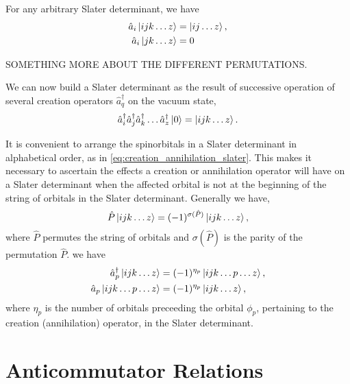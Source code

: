     For any arbitrary Slater determinant, we have 
    \begin{align}
        \hat{a}_i \ket{ijk \dots z} &= \ket{ij \dots z}, \\
        \hat{a}_i \ket{jk \dots z} &= 0       
    \end{align}

    SOMETHING MORE ABOUT THE DIFFERENT PERMUTATIONS.

    We can now build a Slater determinant as the result of successive operation of
    several creation operators $\hat{a}_q^\dagger$ on the vacuum state,
    \begin{equation}
        \label{eq:creation_annihilation_slater}
        \hat{a}^\dagger_i \hat{a}^\dagger_j \hat{a}^\dagger_k \dots \hat{a}^\dagger_z
        \ket{0} = \ket{ijk \dots z}.
    \end{equation}

    It is convenient to arrange the spinorbitals in a Slater determinant in
    alphabetical order, as in \autoref{eq:creation_annihilation_slater}. This 
    makes it necessary to ascertain the effects a creation or annihilation
    operator will have on a Slater determinant when the affected orbital is
    not at the beginning of the string of orbitals in the Slater determinant.
    Generally we have,
    \begin{equation}
        \hat{P} \ket{ijk \dots z} = (-1)^{\sigma(\hat{P})} \ket{ijk \dots z},
    \end{equation}
    where $\hat{P}$ permutes the string of orbitals and $\sigma(\hat{P})$ is the
    parity of the permutation $\hat{P}$. we have
    \begin{align}
        \hat{a}_p^\dagger \ket{ijk \dots z} &= 
            (-1)^{\eta_p} \ket{ijk \dots p \dots z}, \\
        \hat{a}_p \ket{ijk \dots p \dots z} &=
            (-1)^{\eta_p} \ket{ijk \dots z},
    \end{align}
    where $\eta_p$ is the number of orbitals preceeding the orbital $\phi_p$, pertaining
    to the creation (annihilation) operator, in the Slater determinant.

\section{Anticommutator Relations}

